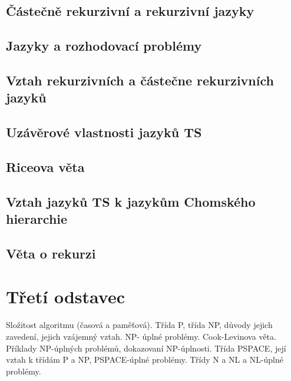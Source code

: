\documentclass[10pt,a4paper]{article}
\begin{document}
	

	\subsection{Částečně rekurzivní a rekurzivní jazyky}
	
	\subsection{Jazyky a rozhodovací problémy}

	\subsection{Vztah rekurzivních a částečne rekurzivních jazyků}

	\subsection{Uzávěrové vlastnosti jazyků TS}

	\subsection{Riceova věta}

	\subsection{Vztah jazyků TS k jazykům Chomského hierarchie}

	\subsection{Věta o rekurzi}



\section{Třetí odstavec}

Složitost algoritmu (časová a paměťová). Třída P, třída NP, důvody jejich zavedení, jejich vzájemný vztah. NP-
úplné problémy. Cook-Levinova věta. Příklady NP-úplných problémů, dokazovaní NP-úplnosti. Třída PSPACE,
její vztah k třídám P a NP, PSPACE-úplné problémy. Třídy N a NL a NL-úplné problémy.
\end{document}

